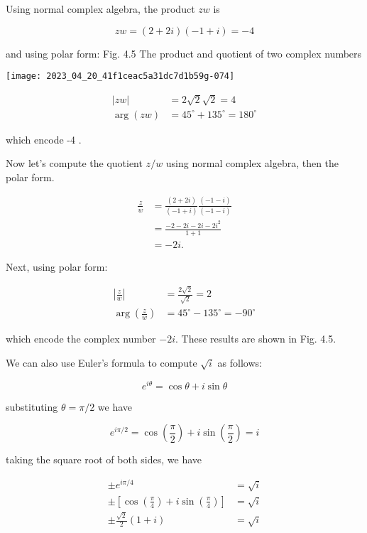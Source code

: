 Using normal complex algebra, the product $z w$ is

$$
    z w=(2+2 i)(-1+i)=-4
$$

and using polar form: Fig. 4.5 The product and quotient of two complex numbers

\begin{center}
    \texttt{[image: 2023\_04\_20\_41f1ceac5a31dc7d1b59g-074]}
\end{center}

$$
    \begin{aligned}
        |z w|      & =2 \sqrt{2} \sqrt{2}=4              \\
        \arg (z w) & =45^{\circ}+135^{\circ}=180^{\circ}
    \end{aligned}
$$

which encode -4 .

Now let's compute the quotient $z / w$ using normal complex algebra, then the polar form.

$$
    \begin{aligned}
        \frac{z}{w} & =\frac{(2+2 i)}{(-1+i)} \frac{(-1-i)}{(-1-i)} \\
                    & =\frac{-2-2 i-2 i-2 i^{2}}{1+1}               \\
                    & =-2 i .
    \end{aligned}
$$

Next, using polar form:

$$
    \begin{aligned}
        \left|\frac{z}{w}\right|      & =\frac{2 \sqrt{2}}{\sqrt{2}}=2      \\
        \arg \left(\frac{z}{w}\right) & =45^{\circ}-135^{\circ}=-90^{\circ}
    \end{aligned}
$$

which encode the complex number $-2 i$. These results are shown in Fig. 4.5.

We can also use Euler's formula to compute $\sqrt{i}$ as follows:

$$
    e^{i \theta}=\cos \theta+i \sin \theta
$$

substituting $\theta=\pi / 2$ we have

$$
    e^{i \pi / 2}=\cos \left(\frac{\pi}{2}\right)+i \sin \left(\frac{\pi}{2}\right)=i
$$

taking the square root of both sides, we have

$$
    \begin{aligned}
        \pm e^{i \pi / 4}                                                                 & =\sqrt{i} \\
        \pm\left[\cos \left(\frac{\pi}{4}\right)+i \sin \left(\frac{\pi}{4}\right)\right] & =\sqrt{i} \\
        \pm \frac{\sqrt{2}}{2}(1+i)                                                       & =\sqrt{i}
    \end{aligned}
$$

